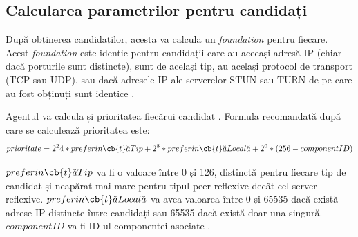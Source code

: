 \subsection{Calcularea parametrilor pentru candidați}
\indent \par După obținerea candidaților, acesta va calcula un \textit{foundation} pentru fiecare. Acest \textit{foundation} este identic pentru candidații care au aceeași adresă IP (chiar dacă porturile sunt distincte), sunt de același tip, au același protocol de transport (TCP sau UDP), sau dacă adresele IP ale serverelor STUN sau TURN de pe care au fost obținuți sunt identice \cite{rfc8445}.
\indent \par Agentul va calcula și prioritatea fiecărui candidat \cite{rfc8445}. Formula recomandată după care se calculează prioritatea este:
\begin{equation}
    prioritate = 2^24 * preferin\cb{t}\breve{a}Tip + 2^8 * preferin\cb{t}\breve{a}Local\breve{a} + 2^0 * (256 - componentID)
    \label{ICEPriority}
\end{equation}
\par \(preferin\cb{t}\breve{a}Tip\) va fi o valoare între 0 și 126, distinctă pentru fiecare tip de candidat și neapărat mai mare pentru tipul peer-reflexive decât cel server-reflexive. \(preferin\cb{t}\breve{a}Local\breve{a}\) va avea valoarea între 0 și 65535 dacă există adrese IP distincte între candidați sau 65535 dacă există doar una singură. \(componentID\) va fi ID-ul componentei asociate \cite{rfc8445}.
